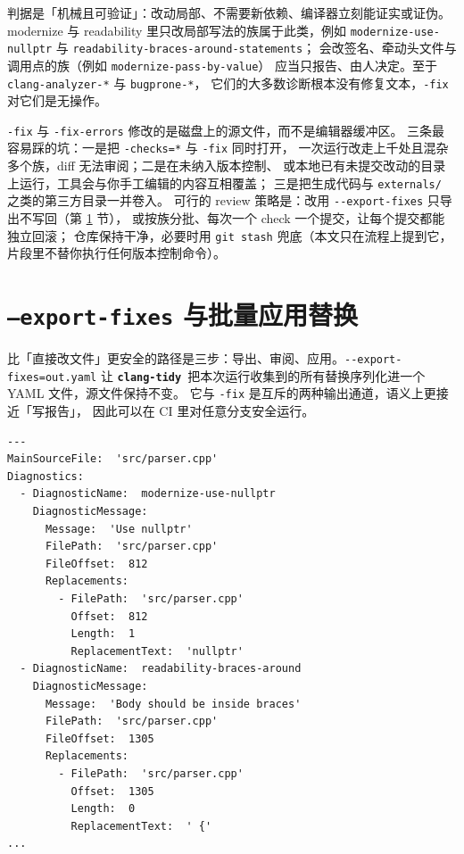 \documentclass[12pt,a4paper,fontset=fandol]{ctexbook}
\newcommand{\Opt}[1]{\texttt{-\/-#1}}
\newcommand{\Lib}[1]{\textbf{\texttt{#1}}}
\newcommand{\Tidy}{\Lib{clang-tidy}}
\begin{document}
\begin{guideline}[title={可以放心交给 -fix 的检查族}]
判据是「机械且可验证」：改动局部、不需要新依赖、编译器立刻能证实或证伪。
modernize 与 readability 里只改局部写法的族属于此类，例如
\texttt{modernize-use-nullptr} 与 \texttt{readability-braces-around-statements}；
会改签名、牵动头文件与调用点的族（例如 \texttt{modernize-pass-by-value}）
应当只报告、由人决定。至于 \texttt{clang-analyzer-*} 与 \texttt{bugprone-*}，
它们的大多数诊断根本没有修复文本，\texttt{-fix} 对它们是无操作。
\end{guideline}

\begin{warning}[title={-fix 直接改文件时的批量误改}]
\texttt{-fix} 与 \texttt{-fix-errors} 修改的是磁盘上的源文件，而不是编辑器缓冲区。
三条最容易踩的坑：一是把 \texttt{-checks=*} 与 \texttt{-fix} 同时打开，
一次运行改走上千处且混杂多个族，diff 无法审阅；二是在未纳入版本控制、
或本地已有未提交改动的目录上运行，工具会与你手工编辑的内容互相覆盖；
三是把生成代码与 \texttt{externals/} 之类的第三方目录一并卷入。
可行的 review 策略是：改用 \Opt{export-fixes} 只导出不写回（第 \ref{sec:ch14-s2} 节），
或按族分批、每次一个 check 一个提交，让每个提交都能独立回滚；
仓库保持干净，必要时用 \texttt{git stash} 兜底（本文只在流程上提到它，
片段里不替你执行任何版本控制命令）。
\end{warning}

\section{\texttt{--export-fixes} 与批量应用替换}\label{sec:ch14-s2}

比「直接改文件」更安全的路径是三步：导出、审阅、应用。\Opt{export-fixes=\allowbreak out.yaml}
让 \Tidy\ 把本次运行收集到的所有替换序列化进一个 YAML 文件，源文件保持不变。
它与 \texttt{-fix} 是互斥的两种输出通道，语义上更接近「写报告」，
因此可以在 CI 里对任意分支安全运行。

\begin{lstlisting}[style=yamlstyle,caption={\Tidy\ 导出的 fix 文件骨架：诊断驱动的格式},label={lst:ch14-fixyaml}]
---
MainSourceFile:  'src/parser.cpp'
Diagnostics:
  - DiagnosticName:  modernize-use-nullptr
    DiagnosticMessage:
      Message:  'Use nullptr'
      FilePath:  'src/parser.cpp'
      FileOffset:  812
      Replacements:
        - FilePath:  'src/parser.cpp'
          Offset:  812
          Length:  1
          ReplacementText:  'nullptr'
  - DiagnosticName:  readability-braces-around
    DiagnosticMessage:
      Message:  'Body should be inside braces'
      FilePath:  'src/parser.cpp'
      FileOffset:  1305
      Replacements:
        - FilePath:  'src/parser.cpp'
          Offset:  1305
          Length:  0
          ReplacementText:  ' {'
...
\end{lstlisting}
\end{document}
